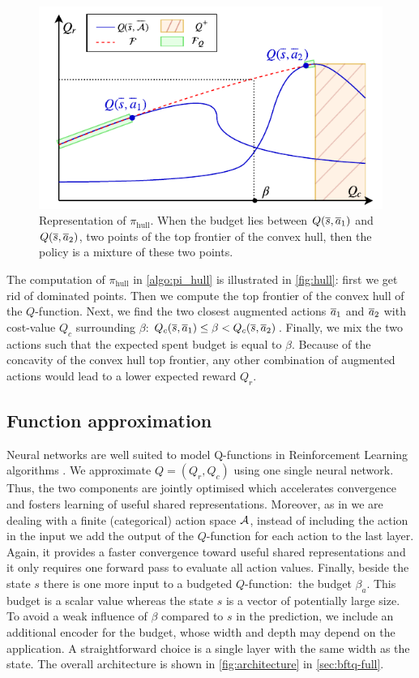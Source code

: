 \begin{figure}[ht]
	\centering
	\includegraphics[width=0.6\linewidth]{img/pi.pdf}
	\caption{Representation of $\pi_\text{hull}$. When the budget lies between $Q(\overline{s},\overline{a}_1)$ and $Q(\overline{s},\overline{a}_2)$, two points of the top frontier of the convex hull, then the policy is a mixture of these two points.}
	\label{fig:hull}
\end{figure}

The computation of $\pi_\text{hull}$ in \autoref{algo:pi_hull} is illustrated in \autoref{fig:hull}: first we get rid of dominated points. Then we compute the top frontier of the convex hull of the $Q$-function. Next, we find the two closest augmented actions $\overline{a}_1$ and $\overline{a}_2$ with cost-value $Q_c$ surrounding $\beta$:  $Q_c(\overline{s},\overline{a}_1)\leq\beta<Q_c(\overline{s},\overline{a}_2)$. Finally, we mix the two actions such that the expected spent budget is equal to $\beta$. Because of the concavity of the convex hull top frontier, any other combination of augmented actions would lead to a lower expected reward $Q_r$. 




\subsection{Function approximation}

Neural networks are well suited to model Q-functions in Reinforcement Learning algorithms \citep{Riedmiller2005,Mnih2015}.  We approximate $Q = (Q_r, Q_c)$ using one single neural network. Thus, the two components are jointly optimised which accelerates convergence and fosters learning of useful shared representations. Moreover, as in \citep{Mnih2015} we are dealing with a finite (categorical) action space $\mathcal{A}$, instead of including the action in the input we add the output of the $Q$-function for each action to the last layer. Again, it provides a faster convergence toward useful shared representations and it only requires one forward pass to evaluate all action values. Finally, beside the state $s$ there is one more input to a budgeted $Q$-function:~the budget $\beta_a$. This budget is a scalar value whereas the state $s$ is a vector of potentially large size. To avoid a weak influence of $\beta$ compared to $s$ in the prediction, we include an additional encoder for the budget, whose width and depth may depend on the application. A straightforward choice is a single layer with the same width as the state. The overall architecture is shown in \autoref{fig:architecture} in \autoref{sec:bftq-full}.

